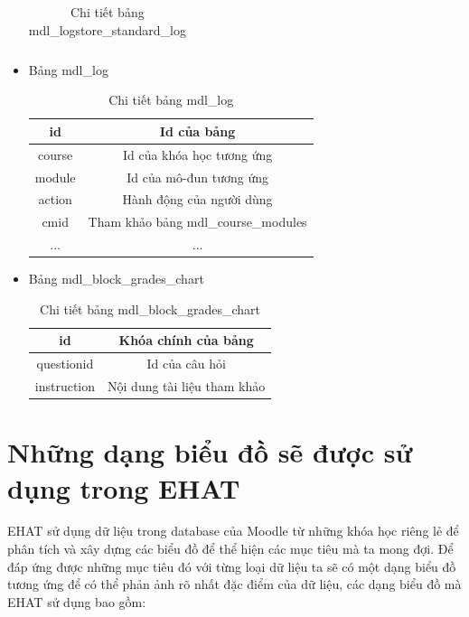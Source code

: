 \begin{itemize}
\begin{center}
\begin{table}[!htp]
\begin{tabular}{|c|c|}
				\hline 
			\end{tabular} 
			\caption{Chi tiết bảng mdl\_logstore\_standard\_log}
			\label{bang17}
		\end{table}
	\end{center}
	\item Bảng mdl\_log
	\begin{center}
		\begin{table}[!htp]
			\centering
			\begin{tabular}{|c|c|}
				\hline 
				id & Id của bảng \\ 
				\hline 
				course & Id của khóa học tương ứng \\ 
				\hline
				module & Id của mô-đun tương ứng \\
				\hline
				action & Hành động của người dùng \\
				\hline 
				cmid & Tham khảo bảng mdl\_course\_modules \\
				\hline
				... & ... \\ 
				\hline 
			\end{tabular} 
			\caption{Chi tiết bảng mdl\_log}
			\label{bang18}
		\end{table}
	\end{center}

	\item Bảng mdl\_block\_grades\_chart
	\begin{center}
		\begin{table}[!htp]
			\centering
			\begin{tabular}{|c|c|}
				\hline 
				id & Khóa chính của bảng \\ 
				\hline 
				questionid & Id của câu hỏi \\ 
				\hline
				instruction & Nội dung tài liệu tham khảo \\
				\hline 
			\end{tabular} 
			\caption{Chi tiết bảng mdl\_block\_grades\_chart}
			\label{bang19}
		\end{table}
	\end{center}
\end{itemize}

\newpage
\section{Những dạng biểu đồ sẽ được sử dụng trong EHAT}
EHAT sử dụng dữ liệu trong database của Moodle từ những khóa học riêng lẻ để phân tích và xây dựng các biểu đồ để thể hiện các mục tiêu mà ta mong đợi. Để đáp ứng được những mục tiêu đó với từng loại dữ liệu ta sẽ có một dạng biểu đồ tương ứng để có thể phản ảnh rõ nhất đặc điểm của dữ liệu, các dạng biểu đồ mà EHAT sử dụng bao gồm:


